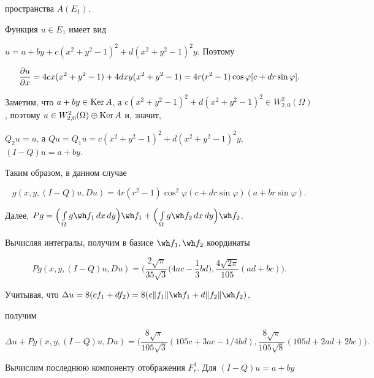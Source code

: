 пространства $A(E_1)$.





Функция $u\in E_1$ имеет вид


$u=a+by+c(x^2+y^2-1)^2+d(x^2+y^2-1)^2y$. Поэтому 


$$


\fr{u}{x} =4cx(x^2+y^2-1)+4dxy(x^2+y^2-1)


=4r(r^2-1)\cos \varphi [c+dr\sin \varphi].


$$


Заметим, что $a+by\in \Ker A$, а $c(x^2+y^2-1)^2+d(x^2+y^2-1)^2\in 


W^2_{2,0}(\Omega)$, поэтому $u\in W^2_{2,0}(\Omega)\oplus \Ker A$ и, значит,


$Q_2u=u$, а $Qu=Q_1u=c(x^2+y^2-1)^2+d(x^2+y^2-1)^2y$, $(I-Q)u=a+by$.





Таким образом, в данном случае 


$$


g(x,y,(I-Q)u,Du)=


4r(r^2-1)\cos ^2\varphi (c+dr\sin \varphi)(a+br\sin \varphi).


$$ 


Далее, $Pg=\Big(\int \limits_{\Omega }g\f_1\, dx\,dy\Big)\f_1+


\Big(\int \limits_{\Omega }g\f_2\, dx\,dy\Big)\f_2$.


Вычисляя интегралы, получим в базисе $\f_1,\f_2$ координаты 


$$


Pg(x,y,(I-Q)u,Du)=\bigg(\frac{2\sqrt{\pi }}{35\sqrt{3}}


\bigg(4ac-\frac{1}{3}bd\bigg),


\frac{4\sqrt{2\pi }}{105}(ad+bc)\bigg).


$$


Учитывая, что $\Delta u= 8(cf_1+df_2)=8(c\|f_1\|\f_1+d\|f_2\|\f_2)$,


получим 


$$


\Delta u+Pg(x,y,(I-Q)u,Du)=


\bigg(\frac{8\sqrt{\pi }}{105\sqrt{3}}(105c+3ac-1/4bd),


\frac{8\sqrt{\pi }}{105\sqrt{8}}(105d+2ad+2bc)\bigg).


$$





Вычислим последнюю компоненту отображения $F_r^1$. Для $(I-Q)u=a+by$


